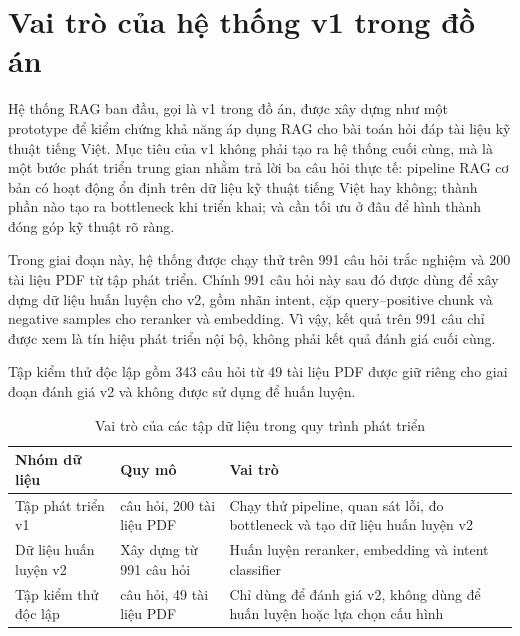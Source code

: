 \documentclass[../DoAn.tex]{subfiles}
\begin{document}
\section{Vai trò của hệ thống v1 trong đồ án}
\label{section:3.1}

Hệ thống RAG ban đầu, gọi là v1 trong đồ án, được xây dựng như một prototype để kiểm chứng khả năng áp dụng RAG cho bài toán hỏi đáp tài liệu kỹ thuật tiếng Việt. Mục tiêu của v1 không phải tạo ra hệ thống cuối cùng, mà là một bước phát triển trung gian nhằm trả lời ba câu hỏi thực tế: pipeline RAG cơ bản có hoạt động ổn định trên dữ liệu kỹ thuật tiếng Việt hay không; thành phần nào tạo ra bottleneck khi triển khai; và cần tối ưu ở đâu để hình thành đóng góp kỹ thuật rõ ràng.

Trong giai đoạn này, hệ thống được chạy thử trên 991 câu hỏi trắc nghiệm và 200 tài liệu PDF từ tập phát triển. Chính 991 câu hỏi này sau đó được dùng để xây dựng dữ liệu huấn luyện cho v2, gồm nhãn intent, cặp query--positive chunk và negative samples cho reranker và embedding. Vì vậy, kết quả trên 991 câu chỉ được xem là tín hiệu phát triển nội bộ, không phải kết quả đánh giá cuối cùng.

Tập kiểm thử độc lập gồm 343 câu hỏi từ 49 tài liệu PDF được giữ riêng cho giai đoạn đánh giá v2 và không được sử dụng để huấn luyện.

\begin{table}[H]
    \centering
    \caption{Vai trò của các tập dữ liệu trong quy trình phát triển}
    \label{tab:data-role}
    {\small
    \setlength{\tabcolsep}{4pt}
    \begin{tabular}{|>{\raggedright\arraybackslash}p{3.4cm}|>{\raggedright\arraybackslash}p{3.6cm}|>{\raggedright\arraybackslash}p{6.3cm}|}
        \hline
        \textbf{Nhóm dữ liệu} & \textbf{Quy mô} & \textbf{Vai trò} \\ \hline
        Tập phát triển v1 & 991 câu hỏi, 200 tài liệu PDF & Chạy thử pipeline, quan sát lỗi, đo bottleneck và tạo dữ liệu huấn luyện v2 \\ \hline
        Dữ liệu huấn luyện v2 & Xây dựng từ 991 câu hỏi & Huấn luyện reranker, embedding và intent classifier \\ \hline
        Tập kiểm thử độc lập & 343 câu hỏi, 49 tài liệu PDF & Chỉ dùng để đánh giá v2, không dùng để huấn luyện hoặc lựa chọn cấu hình \\ \hline
    \end{tabular}
    }
\end{table}
\end{document}
